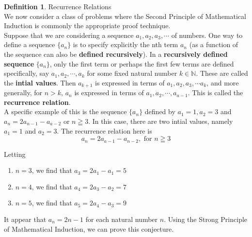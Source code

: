 \documentclass{book}
\theoremstyle{definition}
\newtheorem{definition}{Definition}[section]
\theoremstyle{remark}
\newcommand{\bb}[1]{\mathbb{#1}}
\begin{document}
\begin{definition}
Recurrence Relations \\


We now consider a class of problems where the Second Principle of Mathematical Induction is commonly the appropriate proof technique. \\

Suppose that we are considering a sequence $a_1, a_2, a_3, \cdots $ of numbers. One way to define a sequence $\{ a_n \}$ is to specify explicitly the nth term $a_n$ (as a function of the sequence can also be \textbf{defined recursively}). In a \textbf{recursively defined sequence} $\{ a_n \}$, only the first term or perhaps the first few terms are defined specifically, say $a_1, a_2, \cdots, a_k$ for some fixed natural number $k \in \bb{N}$. These are called the \textbf{intial values}. Then $a_{k+1}$ is expressed in terms of $a_1, a_2, a_3, \cdots a_k$, and more generally, for $n > k$, $a_n$ is expressed in terms of $a_1, a_2, \cdots, a_{a-1}$. This is called the \textbf{recurrence relation}. \\


A specific example of this is the sequence $\{ a_n \}$ defined by $a_1 = 1, a_2=3$ and $a_n = 2a_{n-1}- a_{a-2}$ or $n \geqq 3$. In this case, there are two intial values, namely $a_1 = 1$ and $a_2 = 3$. The recurrence relation here is 
    \begin{equation*}
        a_n = 2a_{a-1}-a_{n-2}, \text{ for } n \geqq 3 
    \end{equation*}

Letting 
    \begin{enumerate}
        \item $n=3$, we find that $a_3 = 2a_1 - a_1 = 5$
        \item $n=4$, we find that $a_4 = 2a_3 - a_2 = 7$
        \item $n=5$, we find that $a_5 = 2a_4 - a_3 = 9$
    \end{enumerate}
It appear that $a_n = 2n-1$ for each natural number $n$. Using the Strong Principle of Mathematical Induction, we can prove this conjecture.
\end{definition}
\end{document}

